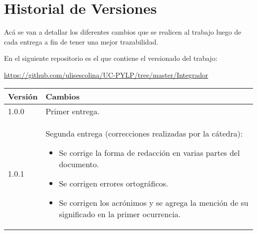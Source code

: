 \section*{Historial de Versiones}
Acá se van a detallar los diferentes cambios que se realicen al trabajo luego
de cada entrega a fin de tener una mejor trazabilidad.

En el siguiente repositorio es el que contiene el versionado del trabajo:
\begin{center}
\url{https://github.com/ulisescolina/UC-PYLP/tree/master/Integrador}
\end{center}

\begin{center}
  \begin{tabular}{||p{2cm} p{10cm}||} 
    \hline
    Versión & Cambios \\ [0.5ex] 
    \hline\hline
    1.0.0 & Primer entrega. \\ [0.5ex]
    \hline
    1.0.1 & Segunda entrega (correcciones realizadas por la cátedra):
    \begin{itemize}
        \item Se corrige la forma de redacción en varias partes del documento.
        \item Se corrigen errores ortográficos.
        \item Se corrigen los acrónimos y se agrega la mención de su
          significado en la primer ocurrencia.
    \end{itemize} \\ %
    \hline
  \end{tabular}
\end{center}
\newpage

